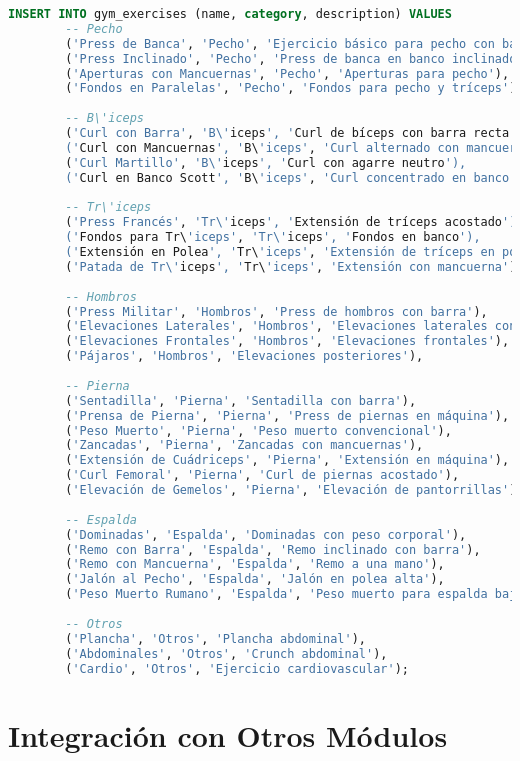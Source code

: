 \documentclass[12pt,a4paper]{article}
\begin{document}
	\begin{lstlisting}[language=SQL, caption=Ejercicios por defecto]
		INSERT INTO gym_exercises (name, category, description) VALUES
		-- Pecho
		('Press de Banca', 'Pecho', 'Ejercicio básico para pecho con barra'),
		('Press Inclinado', 'Pecho', 'Press de banca en banco inclinado'),
		('Aperturas con Mancuernas', 'Pecho', 'Aperturas para pecho'),
		('Fondos en Paralelas', 'Pecho', 'Fondos para pecho y tríceps'),
		
		-- B\'iceps
		('Curl con Barra', 'B\'iceps', 'Curl de bíceps con barra recta'),
		('Curl con Mancuernas', 'B\'iceps', 'Curl alternado con mancuernas'),
		('Curl Martillo', 'B\'iceps', 'Curl con agarre neutro'),
		('Curl en Banco Scott', 'B\'iceps', 'Curl concentrado en banco'),
		
		-- Tr\'iceps
		('Press Francés', 'Tr\'iceps', 'Extensión de tríceps acostado'),
		('Fondos para Tr\'iceps', 'Tr\'iceps', 'Fondos en banco'),
		('Extensión en Polea', 'Tr\'iceps', 'Extensión de tríceps en polea alta'),
		('Patada de Tr\'iceps', 'Tr\'iceps', 'Extensión con mancuerna'),
		
		-- Hombros
		('Press Militar', 'Hombros', 'Press de hombros con barra'),
		('Elevaciones Laterales', 'Hombros', 'Elevaciones laterales con mancuernas'),
		('Elevaciones Frontales', 'Hombros', 'Elevaciones frontales'),
		('Pájaros', 'Hombros', 'Elevaciones posteriores'),
		
		-- Pierna
		('Sentadilla', 'Pierna', 'Sentadilla con barra'),
		('Prensa de Pierna', 'Pierna', 'Press de piernas en máquina'),
		('Peso Muerto', 'Pierna', 'Peso muerto convencional'),
		('Zancadas', 'Pierna', 'Zancadas con mancuernas'),
		('Extensión de Cuádriceps', 'Pierna', 'Extensión en máquina'),
		('Curl Femoral', 'Pierna', 'Curl de piernas acostado'),
		('Elevación de Gemelos', 'Pierna', 'Elevación de pantorrillas'),
		
		-- Espalda
		('Dominadas', 'Espalda', 'Dominadas con peso corporal'),
		('Remo con Barra', 'Espalda', 'Remo inclinado con barra'),
		('Remo con Mancuerna', 'Espalda', 'Remo a una mano'),
		('Jalón al Pecho', 'Espalda', 'Jalón en polea alta'),
		('Peso Muerto Rumano', 'Espalda', 'Peso muerto para espalda baja'),
		
		-- Otros
		('Plancha', 'Otros', 'Plancha abdominal'),
		('Abdominales', 'Otros', 'Crunch abdominal'),
		('Cardio', 'Otros', 'Ejercicio cardiovascular');
	\end{lstlisting}
	
	\section{Integración con Otros Módulos}
	
\end{document}
